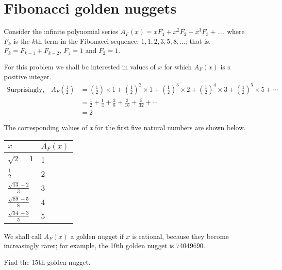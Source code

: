 \section[Problem \#137: Fibonacci golden nuggets]{Fibonacci golden nuggets}
\label{sec:problem_137}

Consider the infinite polynomial series $A_F(x) = x F_1 + x^2 F_2 + x^3 F_3 + \dots$, where
$F_k$ is the $k$th term in the Fibonacci
sequence: $1, 1, 2, 3, 5, 8, \dots$; that is, $F_k = F_{k-1} + F_{k-2}$,
$F_1 = 1$ and $F_2 = 1$.

For this problem we shall be interested in values of $x$ for which $A_F(x)$ is a positive integer.
\begin{align*}
\text{Surprisingly,} \quad{} A_F(\tfrac{1}{2}) &= (\tfrac{1}{2})\times 1 + (\tfrac{1}{2})^2\times 1 + (\tfrac{1}{2})^3\times 2 + (\tfrac{1}{2})^4\times 3 + (\tfrac{1}{2})^5\times 5 + \cdots \\
&= \tfrac{1}{2} + \tfrac{1}{4} + \tfrac{2}{8} + \tfrac{3}{16} + \tfrac{5}{32} + \cdots \\
&= 2
\end{align*}

The corresponding values of \emph{x} for the first five natural numbers
are shown below.

\begin{longtable}[]{@{}ll@{}}
\toprule
$x$ & $A_F(x)$ \\
\midrule
\endhead
$\sqrt{2}-1$ & 1 \\
$\tfrac{1}{2}$ & 2 \\
$\frac{\sqrt{13}-2}{3}$ & 3 \\
$\frac{\sqrt{89}-5}{8}$ & 4 \\
$\frac{\sqrt{34}-3}{5}$ & 5 \\
\bottomrule
\end{longtable}

We shall call $A_F(x)$ a golden nugget if
$x$ is rational, because they become increasingly
rarer; for example, the 10th golden nugget is 74049690.

Find the 15th golden nugget.